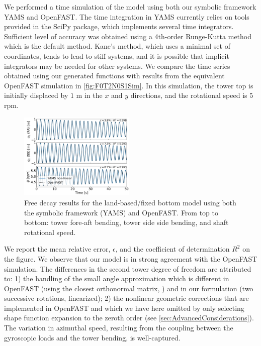 \documentclass[wes, manuscript]{copernicus}
\begin{document}
We performed a time simulation of the model using both our symbolic framework YAMS and OpenFAST.
The time integration in YAMS currently relies on tools provided in the SciPy package, which implements several time integrators.
Sufficient level of accuracy was obtained using a 4th-order Runge-Kutta method which is the default method.
Kane's method, which uses a minimal set of coordinates, tends to lead to stiff systems, and it is possible that implicit integrators may be needed for other systems.
We compare the time series obtained using our generated functions with results from the equivalent OpenFAST simulation in \autoref{fig:F0T2N0S1Sim}.
In this simulation, the tower top is initially displaced by $1$ \unit{m} in the $x$ and $y$ directions, and the rotational speed is $5$ \unit{rpm}.
\noindent\begin{figure}[!htb]\centering%
  \includegraphics[width=0.49\textwidth]{figs/F0T2N0S1Sim}
  \caption{Free decay results for the land-based/fixed bottom model using both the symbolic framework (YAMS) and OpenFAST. From top to bottom: tower fore-aft bending, tower side side bending, and shaft rotational speed.}\label{fig:F0T2N0S1Sim}%
\end{figure}
We report the mean relative error, $\epsilon$, and the coefficient of determination $R^2$ on the figure.
We observe that our model is in strong agreement with the OpenFAST simulation.
The differences in the second tower degree of freedom are attributed to: 1) the handling of the small angle approximation which is different in OpenFAST (using the closest orthonormal matrix, \cite{Jonkman:2009}) and in our formulation (two successive rotations, linearized); 2) the nonlinear geometric corrections that are implemented in OpenFAST and which we have here omitted by only selecting shape function expansion to the zeroth order (see \autoref{sec:AdvancedConsiderations}). 
The variation in azimuthal speed, resulting from the coupling between the gyroscopic loads and the tower bending, is well-captured. 
\end{document}
